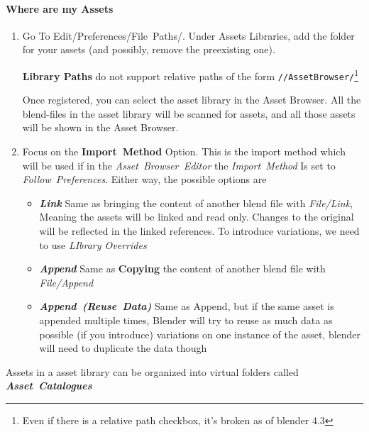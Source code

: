 \documentclass{article}
\begin{document}
\paragraph{Where are my Assets}
\begin{enumerate}[noitemsep, topsep=0pt]
    \item Go To \mbox{Edit/Preferences/File Paths/}. Under Assets Libraries, add the folder for your assets (and possibly, remove the preexisting one). 
    \begin{center}
        \textbf{Library Paths} do not support relative paths of the form \mbox{\texttt{//AssetBrowser/}}\footnote{Even if there is a relative path checkbox, it's broken as of blender 4.3}
    \end{center}
    \begin{center}
        Once registered, you can select the asset library in the Asset Browser. All the blend-files in the asset library will be scanned for assets, and all those assets will be shown in the Asset Browser.
    \end{center}
    \item Focus on the \mbox{\textbf{Import Method}} Option. This is the import method which will be used if in the \mbox{\textit{Asset Browser Editor}} the \mbox{\textit{Import Method}}
    Is set to \mbox{\textit{Follow Preferences}}. Either way, the possible options are
    \begin{itemize}[noitemsep, topsep=0pt]
        \item \mbox{\textit{\textbf{Link}}} Same as bringing the content of another blend file with \mbox{\textit{File/Link}}, Meaning the assets will be linked and read only. Changes to the
        original will be reflected in the linked references. To introduce variations, we need to use \textit{LIbrary Overrides}
        \item \mbox{\textit{\textbf{Append}}} Same as \textbf{Copying} the content of another blend file with \mbox{\textit{File/Append}}
        \item \mbox{\textit{\textbf{Append (Reuse Data)}}} Same as Append, but if the same asset is appended multiple times, Blender will try to reuse as much data as possible (if you introduce)
        variations on one instance of the asset, blender will need to duplicate the data though
    \end{itemize}
\end{enumerate}
Assets in a asset library can be organized into virtual folders called \mbox{\textbf{\textit{Asset Catalogues}}}
\end{document}
